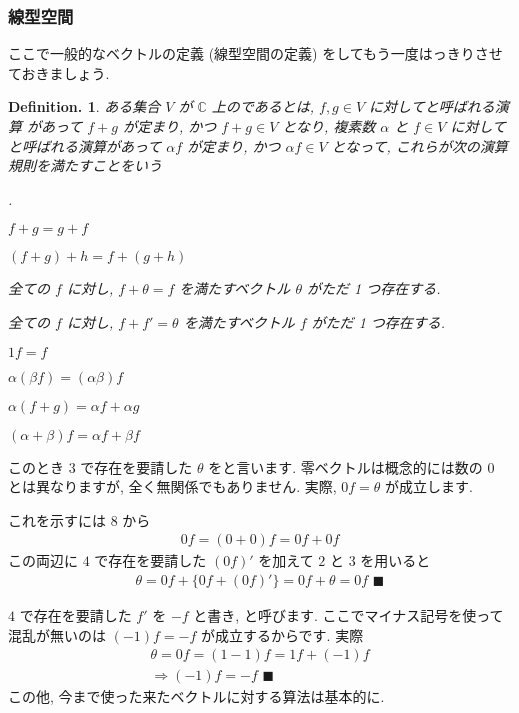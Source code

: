 \documentclass[openany, a4paper, oneside]{jsbook}
\newcounter{enum2}
\renewenvironment{enumerate}{%
\begin{list}%
{%
\arabic{enum2}.\ \,%
}%
{%
\usecounter{enum2}
\setlength{\itemindent}{0pt}%
\setlength{\leftmargin}{15pt}%
\setlength{\rightmargin}{0pt}%
\setlength{\labelsep}{0pt}%
\setlength{\labelwidth}{6pt}%
\setlength{\itemsep}{0pt}%
\setlength{\parsep}{0pt}%
\setlength{\listparindent}{0pt}%
}
}{%
\end{list}%
}
\theoremstyle{break}
\theoremstyle{breakdefn}
\newtheorem{defn}[thm]{Definition.}
\newcommand{\bC}{\mathbb{C}}
\begin{document}
\subsubsection{線型空間}


ここで一般的なベクトルの定義 (線型空間の定義) をしてもう一度はっきりさせておきましょう.
\begin{defn}
ある集合 $V$ が $\bC$ 上のであるとは,
$f,g \in V$ に対してと呼ばれる演算
があって $f+g$ が定まり, かつ $f+g \in V$ となり, 複素数 $\alpha$ と $f\in V$ に対して
と呼ばれる演算があって
$\alpha f$ が定まり, かつ $\alpha f \in V$ となって, これらが次の演算規則を満たすことをいう
\begin{enumerate}
\item  $f + g = g + f$
\item  $(f + g ) + h = f + ( g + h )$
\item 全ての $f$ に対し,  $f + \theta = f$ を満たすベクトル $\theta$ がただ 1 つ存在する.
\item 全ての $f$ に対し,  $f + f' = \theta$ を満たすベクトル $f$ がただ 1 つ存在する.
\item  $1f = f$
\item  $\alpha (\beta f) = (\alpha \beta) f$
\item  $\alpha (f + g ) = \alpha f + \alpha g$
\item  $(\alpha + \beta ) f = \alpha f + \beta f$
\end{enumerate}
\end{defn}
このとき 3 で存在を要請した $\theta$ をと言います.
零ベクトルは概念的には数の $0$ とは異なりますが, 全く無関係でもありません. 実際,  $0f=\theta$ が成立します.

これを示すには 8 から
    \begin{align}
        0f= (0+0) f=0f + 0f
    \end{align}
この両辺に $4$ で存在を要請した $(0f)'$ を加えて $2$ と $3$ を用いると
    \begin{align}
        \theta = 0f + \{ 0f + (0f)' \} = 0f + \theta = 0f \,\, \blacksquare
    \end{align}

 $4$ で存在を要請した $f'$ を $-f$ と書き, と呼びます. ここでマイナス記号を使って
混乱が無いのは $(-1) f=-f$ が成立するからです. 実際
    \begin{gather}
        \theta = 0f = (1-1) f = 1f + (-1) f \\
        \Longrightarrow
        (-1) f = -f \,\, \blacksquare
    \end{gather}
この他, 今まで使った来たベクトルに対する算法は基本的に.
\end{document}
